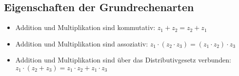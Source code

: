 \subsection{Eigenschaften der Grundrechenarten}
\begin{itemize}\itemsep0em
	\item Addition und Multiplikation sind kommutativ: $z_1 + z_2 = z_2 + z_1$
	\item Addition und Multiplikation sind assoziativ: $z_1 \cdot (z_2 \cdot z_3) = (z_1 \cdot z_2) \cdot z_3$
	\item Addition und Multiplikation sind über das Distributivgesetz verbunden: $z_1 \cdot (z_2 + z_3) = z_1 \cdot z_2 + z_1 \cdot z_3$
\end{itemize}